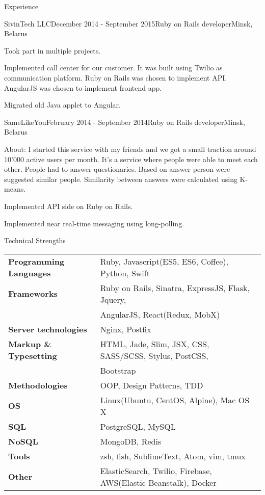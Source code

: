 \documentclass{resume}
\begin{document}
\begin{rSection}{Experience}
    \begin{rSubsection}{SivinTech LLC}{December 2014 - September 2015}{Ruby on Rails developer}{Minsk, Belarus}
    \item Took part in multiple projects. 
    \item Implemented call center for our customer. It was built using Twilio as communication platform. Ruby on Rails was chosen to implement API. AngularJS was chosen to implement frontend app.
    \item Migrated old Java applet to Angular.  
    \end{rSubsection}

    \begin{rSubsection}{SameLikeYou}{February 2014 - September 2014}{Ruby on Rails developer}{Minsk, Belarus}
    \item About: I started this service with my friends and we got a small traction around 10’000 active users per month. It's a service where people were able to meet each other. People had to answer questionaries. Based on answer person were suggested similar people. Similarity between answers were calculated using K-means.
    \item Implemented API side on Ruby on Rails.
    \item Implemented near real-time messaging using long-polling.
    \end{rSubsection}
  \end{rSection}
  
  \begin{rSection}{Technical Strengths}
    \begin{tabular}{ @{} >{\bfseries}l @{\hspace{6ex}} l }
      Programming Languages & Ruby, Javascript(ES5, ES6, Coffee), Python, Swift \\
      Frameworks            & Ruby on Rails, Sinatra, ExpressJS, Flask, Jquery, \\ 
                            & AngularJS, React(Redux, MobX) \\
      Server technologies   & Nginx, Postfix \\
      Markup \& Typesetting & HTML, Jade, Slim, JSX, CSS, SASS/SCSS, Stylus, PostCSS, \\
                            & Bootstrap \\
      Methodologies         & OOP, Design Patterns, TDD \\
      OS                    & Linux(Ubuntu, CentOS, Alpine), Mac OS X \\
      SQL                   & PostgreSQL, MySQL \\
      NoSQL                 & MongoDB, Redis \\
      Tools                 & zsh, fish, SublimeText, Atom, vim, tmux \\
      Other                 & ElasticSearch, Twilio, Firebase, AWS(Elastic Beanstalk), Docker \\
    \end{tabular}
  \end{rSection}
\end{document}
